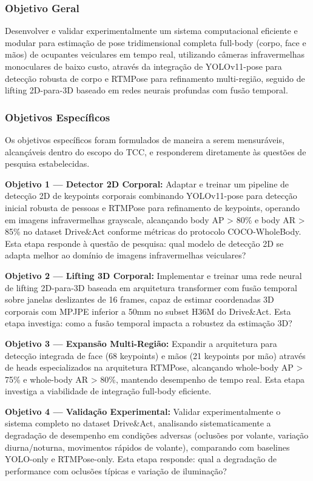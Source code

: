 \documentclass[12pt, a4paper]{article}
\begin{document}
\subsubsection{Objetivo Geral}

Desenvolver e validar experimentalmente um sistema computacional eficiente e modular para estimação de pose tridimensional completa full-body (corpo, face e mãos) de ocupantes veiculares em tempo real, utilizando câmeras infravermelhas monoculares de baixo custo, através da integração de YOLOv11-pose para detecção robusta de corpo e RTMPose para refinamento multi-região, seguido de lifting 2D-para-3D baseado em redes neurais profundas com fusão temporal.

\subsubsection{Objetivos Específicos}

Os objetivos específicos foram formulados de maneira a serem mensuráveis, alcançáveis dentro do escopo do TCC, e responderem diretamente às questões de pesquisa estabelecidas.

\textbf{Objetivo 1 --- Detector 2D Corporal:} Adaptar e treinar um pipeline de detecção 2D de keypoints corporais combinando YOLOv11-pose para detecção inicial robusta de pessoas e RTMPose para refinamento de keypoints, operando em imagens infravermelhas grayscale, alcançando body AP > 80\% e body AR > 85\% no dataset Drive\&Act conforme métricas do protocolo COCO-WholeBody. Esta etapa responde à questão de pesquisa: qual modelo de detecção 2D se adapta melhor ao domínio de imagens infravermelhas veiculares?

\textbf{Objetivo 2 --- Lifting 3D Corporal:} Implementar e treinar uma rede neural de lifting 2D-para-3D baseada em arquitetura transformer com fusão temporal sobre janelas deslizantes de 16 frames, capaz de estimar coordenadas 3D corporais com MPJPE inferior a 50mm no subset H36M do Drive\&Act. Esta etapa investiga: como a fusão temporal impacta a robustez da estimação 3D?

\textbf{Objetivo 3 --- Expansão Multi-Região:} Expandir a arquitetura para detecção integrada de face (68 keypoints) e mãos (21 keypoints por mão) através de heads especializados na arquitetura RTMPose, alcançando whole-body AP > 75\% e whole-body AR > 80\%, mantendo desempenho de tempo real. Esta etapa investiga a viabilidade de integração full-body eficiente.

\textbf{Objetivo 4 --- Validação Experimental:} Validar experimentalmente o sistema completo no dataset Drive\&Act, analisando sistematicamente a degradação de desempenho em condições adversas (oclusões por volante, variação diurna/noturna, movimentos rápidos de volante), comparando com baselines YOLO-only e RTMPose-only. Esta etapa responde: qual a degradação de performance com oclusões típicas e variação de iluminação?
\end{document}
